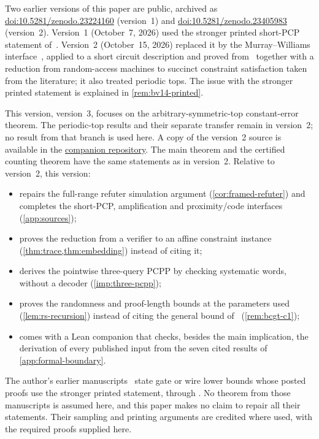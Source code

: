 \documentclass[11pt,letterpaper]{article}
\theoremstyle{definition}
\theoremstyle{remark}
\begin{document}
Two earlier versions of this paper are public, archived as
\href{https://doi.org/10.5281/zenodo.23224160}{doi:10.5281/zenodo.23224160}
(version~1) and
\href{https://doi.org/10.5281/zenodo.23405983}{doi:10.5281/zenodo.23405983}
(version~2). Version~1 (October~7, 2026) used the stronger printed
short-PCP statement of~\cite[Theorem~1.1]{BV14}. Version~2
(October~15, 2026) replaced it by the Murray--Williams interface~\cite{MW20}, applied to a
short circuit description and proved from~\cite{BCGT13} together with a
reduction from random-access machines to succinct constraint
satisfaction taken from the literature; it also treated periodic
tops. The issue with the
stronger printed statement is explained in \cref{rem:bv14-printed}.

This version, version~3, focuses on the arbitrary-symmetric-top
constant-error theorem. The periodic-top results and their separate
transfer remain in version~2; no result from that branch is used here.
A copy of the version~2 source is available in the
\href{https://github.com/devnag/near-cubic-gates-lean/blob/a6d0432a5398550a8a30e92b856630ba3f57cbd7/paper/paper.tex}{companion repository}.
The main theorem and the certified counting theorem have the same
statements as in version~2. Relative to version~2, this version:
\begin{itemize}
\item repairs the full-range refuter simulation argument
(\cref{cor:framed-refuter}) and completes the short-PCP, amplification
and proximity/code interfaces (\cref{app:sources});
\item proves the reduction from a verifier to an affine constraint
instance (\cref{thm:trace,thm:embedding}) instead of citing it;
\item derives the pointwise three-query PCPP by checking systematic
words, without a decoder (\cref{imp:three-pcpp});
\item proves the randomness and proof-length bounds at the parameters
used (\cref{lem:rs-recursion}) instead of citing the general bound
of~\cite[Lemma~C.1]{BCGT13} (\cref{rem:bcgt-c1});
\item comes with a Lean companion that checks, besides the main
implication, the derivation of every published input from the seven
cited results of \cref{app:formal-boundary}.
\end{itemize}

The author's earlier manuscripts~\cite{NagGate,NagCubic,NagSeven}
state gate or wire lower bounds whose posted proofs use the stronger
printed statement, through \cite[Lemma~3.10]{CLW20}. No theorem from
those manuscripts is assumed here, and this paper makes no claim to
repair all their statements. Their sampling and printing arguments
are credited where used, with the required proofs supplied here.
\end{document}

